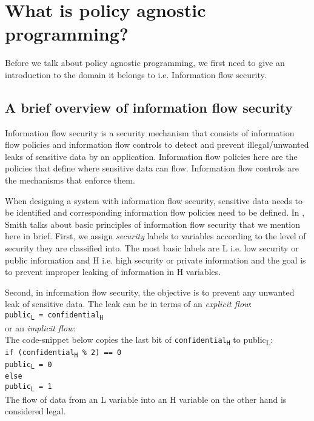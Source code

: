 \chapter{What is policy agnostic programming?\label{chap:PAP}}

Before we talk about policy agnostic programming, we first need to give an
introduction to the domain it belongs to i.e. Information flow security.

\section{A brief overview of information flow security}

Information flow security is a security mechanism that consists of information flow
policies and information flow controls to detect and prevent illegal/unwanted leaks
of sensitive data by an application. Information flow policies here are the policies
that define where sensitive data can flow. Information flow controls are the mechanisms
that enforce them.

When designing a system with information flow security, sensitive data needs to
be identified and corresponding information flow policies need to be defined. In
\cite{PrincInfoSec}, Smith talks about basic principles of information flow security
that we mention here in brief. First, we assign \textit{security} labels to variables
according to the level of security they are classified into. The most basic labels
are L i.e. low security or public information and H i.e. high security or private
information and the goal is to prevent improper leaking of information in H variables.

Second, in information flow security, the
objective is to prevent any unwanted leak of sensitive data. The leak can be in
terms of an \textit{explicit flow}: \\ \indent
\texttt{public\textsubscript{L} = confidential\textsubscript{H}} \\
\noindent or an \textit{implicit flow}: \\ The code-snippet below
copies the last bit of \texttt{confidential\textsubscript{H}} to public\textsubscript{L}: \\
\indent
	\texttt{if (confidential\textsubscript{H} \% 2)  == 0 \\ \indent \indent
		public\textsubscript{L} = 0 \\ \indent
	else \\ \indent \indent
		public\textsubscript{L} = 1} \\
The flow of data from an L variable into an H variable on the other hand is considered
legal.

